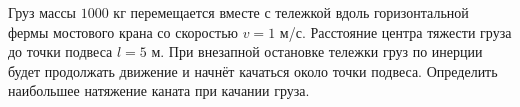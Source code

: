 Груз массы $1000$ кг перемещается вместе с тележкой
вдоль горизонтальной фермы мостового крана со скоростью $v = 1$ м/с.
Расстояние центра тяжести груза до точки подвеса $l = 5$ м.
При внезапной остановке тележки груз по инерции будет продолжать движение
и начнёт качаться около точки подвеса.
Определить наибольшее натяжение каната при качании груза.
